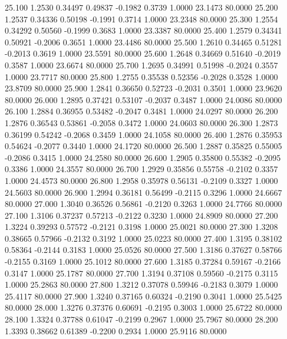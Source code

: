   25.100   1.2530   0.34497   0.49837  -0.1982   0.3739   1.0000  23.1473  80.0000
  25.200   1.2537   0.34336   0.50198  -0.1991   0.3714   1.0000  23.2348  80.0000
  25.300   1.2554   0.34292   0.50560  -0.1999   0.3683   1.0000  23.3387  80.0000
  25.400   1.2579   0.34341   0.50921  -0.2006   0.3651   1.0000  23.4486  80.0000
  25.500   1.2610   0.34465   0.51281  -0.2013   0.3619   1.0000  23.5591  80.0000
  25.600   1.2648   0.34669   0.51640  -0.2019   0.3587   1.0000  23.6674  80.0000
  25.700   1.2695   0.34991   0.51998  -0.2024   0.3557   1.0000  23.7717  80.0000
  25.800   1.2755   0.35538   0.52356  -0.2028   0.3528   1.0000  23.8709  80.0000
  25.900   1.2841   0.36650   0.52723  -0.2031   0.3501   1.0000  23.9620  80.0000
  26.000   1.2895   0.37421   0.53107  -0.2037   0.3487   1.0000  24.0086  80.0000
  26.100   1.2884   0.36955   0.53482  -0.2047   0.3481   1.0000  24.0297  80.0000
  26.200   1.2876   0.36543   0.53861  -0.2058   0.3472   1.0000  24.0603  80.0000
  26.300   1.2873   0.36199   0.54242  -0.2068   0.3459   1.0000  24.1058  80.0000
  26.400   1.2876   0.35953   0.54624  -0.2077   0.3440   1.0000  24.1720  80.0000
  26.500   1.2887   0.35825   0.55005  -0.2086   0.3415   1.0000  24.2580  80.0000
  26.600   1.2905   0.35800   0.55382  -0.2095   0.3386   1.0000  24.3557  80.0000
  26.700   1.2929   0.35856   0.55758  -0.2102   0.3357   1.0000  24.4573  80.0000
  26.800   1.2958   0.35978   0.56131  -0.2109   0.3327   1.0000  24.5603  80.0000
  26.900   1.2994   0.36181   0.56499  -0.2115   0.3296   1.0000  24.6667  80.0000
  27.000   1.3040   0.36526   0.56861  -0.2120   0.3263   1.0000  24.7766  80.0000
  27.100   1.3106   0.37237   0.57213  -0.2122   0.3230   1.0000  24.8909  80.0000
  27.200   1.3224   0.39293   0.57572  -0.2121   0.3198   1.0000  25.0021  80.0000
  27.300   1.3208   0.38665   0.57966  -0.2132   0.3192   1.0000  25.0223  80.0000
  27.400   1.3195   0.38102   0.58364  -0.2144   0.3183   1.0000  25.0526  80.0000
  27.500   1.3186   0.37627   0.58766  -0.2155   0.3169   1.0000  25.1012  80.0000
  27.600   1.3185   0.37284   0.59167  -0.2166   0.3147   1.0000  25.1787  80.0000
  27.700   1.3194   0.37108   0.59560  -0.2175   0.3115   1.0000  25.2863  80.0000
  27.800   1.3212   0.37078   0.59946  -0.2183   0.3079   1.0000  25.4117  80.0000
  27.900   1.3240   0.37165   0.60324  -0.2190   0.3041   1.0000  25.5425  80.0000
  28.000   1.3276   0.37376   0.60691  -0.2195   0.3003   1.0000  25.6722  80.0000
  28.100   1.3324   0.37788   0.61047  -0.2199   0.2967   1.0000  25.7967  80.0000
  28.200   1.3393   0.38662   0.61389  -0.2200   0.2934   1.0000  25.9116  80.0000
